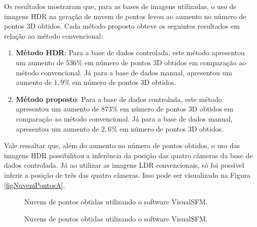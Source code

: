 Os resultados mostraram que, para as bases de imagens utilizadas, o uso de imagens HDR na geração de nuvem de pontos levou ao aumento no número de pontos 3D obtidos. Cada método proposto obteve os seguintes resultados em relação ao método convencional:

\begin{enumerate}
\item \textbf{Método HDR}: Para a base de dados controlada, este método apresentou um aumento de $536\%$ em número de pontos 3D obtidos em comparação ao método convencional. Já para a base de dados manual, apresentou um aumento de $1,9\%$ em número de pontos 3D obtidos.

\item \textbf{Método proposto}: Para a base de dados controlada, este método apresentou um aumento de $873\%$ em número de pontos 3D obtidos em comparação ao método convencional. Já para a base de dados manual, apresentou um aumento de $2,6\%$ em número de pontos 3D obtidos.
\end{enumerate}

Vale ressaltar que, além do aumento no número de pontos obtidos, o uso das imagens HDR possibilitou a inferência da posição das quatro câmeras da base de dados controlada. Já ao utilizar as imagens LDR convencionais, só foi possível inferir a posição de três das quatro câmeras. Isso pode ser visualizado na Figura \ref{figNuvemPontosA}.

\begin{figure}[H]
  \centering 
  \quad %
  \quad %
  \caption{Nuvens de pontos obtidas utilizando o software VisualSFM.}
  \label{figNuvemPontos}
\end{figure}

\begin{figure}[H]
  \centering 
  \quad %
  \quad %
  \caption{Nuvens de pontos obtidas utilizando o software VisualSFM.}
  \label{figNuvemPontos2}
\end{figure}